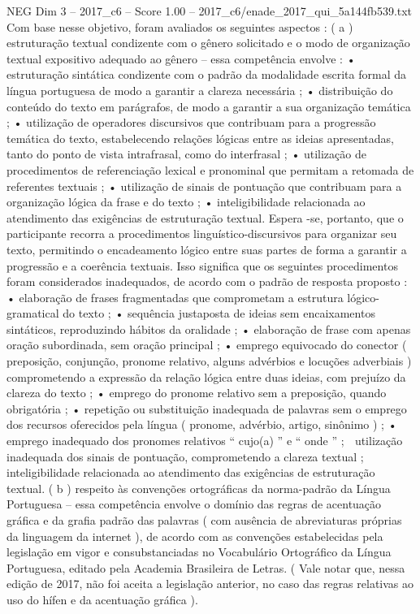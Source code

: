 \begin{textsample}{NEG Dim 3 – 2017\_c6 – Score 1.00 – 2017\_c6/enade\_2017\_qui\_5a144fb539.txt}
Com base nesse objetivo, foram avaliados os seguintes aspectos : ( a ) estruturação textual condizente com o gênero solicitado e o modo de organização textual expositivo adequado ao gênero – essa competência envolve : • estruturação sintática condizente com o padrão da modalidade escrita formal da língua portuguesa de modo a garantir a clareza necessária ; • distribuição do conteúdo do texto em parágrafos, de modo a garantir a sua organização temática ; • utilização de operadores discursivos que contribuam para a progressão temática do texto, estabelecendo relações lógicas entre as ideias apresentadas, tanto do ponto de vista intrafrasal, como do interfrasal ; • utilização de procedimentos de referenciação lexical e pronominal que permitam a retomada de referentes textuais ; • utilização de sinais de pontuação que contribuam para a organização lógica da frase e do texto ; • inteligibilidade relacionada ao atendimento das exigências de estruturação textual.
Espera -se, portanto, que o participante recorra a procedimentos linguístico-discursivos para organizar seu texto, permitindo o encadeamento lógico entre suas partes de forma a garantir a progressão e a coerência textuais.
Isso significa que os seguintes procedimentos foram considerados inadequados, de acordo com o padrão de resposta proposto : • elaboração de frases fragmentadas que comprometam a estrutura lógico-gramatical do texto ; • sequência justaposta de ideias sem encaixamentos sintáticos, reproduzindo hábitos da oralidade ; • elaboração de frase com apenas oração subordinada, sem oração principal ; • emprego equivocado do conector ( preposição, conjunção, pronome relativo, alguns advérbios e locuções adverbiais ) comprometendo a expressão da relação lógica entre duas ideias, com prejuízo da clareza do texto ; • emprego do pronome relativo sem a preposição, quando obrigatória ; • repetição ou substituição inadequada de palavras sem o emprego dos recursos oferecidos pela língua ( pronome, advérbio, artigo, sinônimo ) ; • emprego inadequado dos pronomes relativos “ cujo(a) ” e “ onde ” ;  utilização inadequada dos sinais de pontuação, comprometendo a clareza textual ;  inteligibilidade relacionada ao atendimento das exigências de estruturação textual. ( b ) respeito às convenções ortográficas da norma-padrão da Língua Portuguesa – essa competência envolve o domínio das regras de acentuação gráfica e da grafia padrão das palavras ( com ausência de abreviaturas próprias da linguagem da internet ), de acordo com as convenções estabelecidas pela legislação em vigor e consubstanciadas no Vocabulário Ortográfico da Língua Portuguesa, editado pela Academia Brasileira de Letras. ( Vale notar que, nessa edição de 2017, não foi aceita a legislação anterior, no caso das regras relativas ao uso do hífen e da acentuação gráfica ).

\end{textsample}
